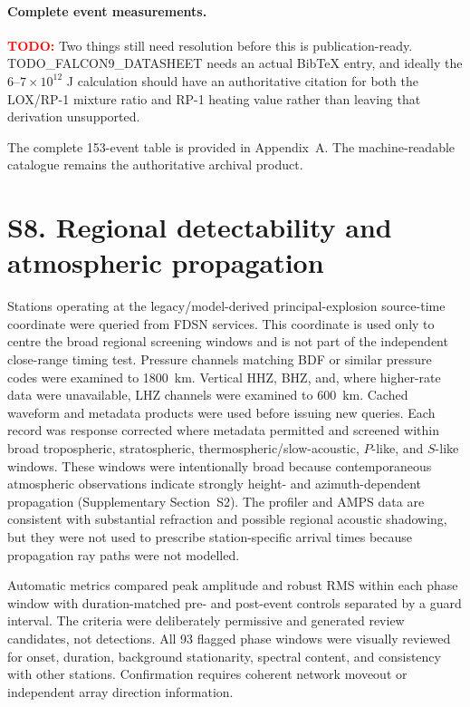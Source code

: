 \documentclass[]{seismica}
\newcommand{\todo}[1]{%
  \par\noindent
  \colorbox{yellow!40}{%
    \parbox{0.96\linewidth}{%
      \textbf{\textcolor{red}{TODO:}} #1
    }%
  }%
  \par
}
\begin{document}
\paragraph{Complete event measurements.}

\todo{Two things still need resolution before this is publication-ready. TODO_FALCON9_DATASHEET needs an actual BibTeX entry, and ideally the \(6\)–\(7\times10^{12}\) J calculation should have an authoritative citation for both the LOX/RP-1 mixture ratio and RP-1 heating value rather than leaving that derivation unsupported.}

The complete 153-event table is provided in Appendix~A. The machine-readable
catalogue remains the authoritative archival product.


\section*{S8. Regional detectability and atmospheric propagation}
\label{sec:supp_regional}

Stations operating at the legacy/model-derived principal-explosion source-time coordinate were queried from
FDSN services. This coordinate is used only to centre the broad regional screening windows and is not part of the independent close-range timing test. Pressure channels matching BDF or similar pressure codes were
examined to 1800~km. Vertical HHZ, BHZ, and, where higher-rate data were
unavailable, LHZ channels were examined to 600~km. Cached waveform and metadata
products were used before issuing new queries. Each record was response
corrected where metadata permitted and screened within broad tropospheric,
stratospheric, thermospheric/slow-acoustic, $P$-like, and $S$-like windows.
These windows were intentionally broad because contemporaneous atmospheric
observations indicate strongly height- and azimuth-dependent propagation
(Supplementary Section~S2). The profiler and AMPS data are consistent with
substantial refraction and possible regional acoustic shadowing, but they were
not used to prescribe station-specific arrival times because propagation ray
paths were not modelled.

Automatic metrics compared peak amplitude and robust RMS within each phase
window with duration-matched pre- and post-event controls separated by a guard
interval. The criteria were deliberately permissive and generated review
candidates, not detections. All 93 flagged phase windows were visually
reviewed for onset, duration, background stationarity, spectral content, and
consistency with other stations. Confirmation requires coherent network
moveout or independent array direction information.
\end{document}
